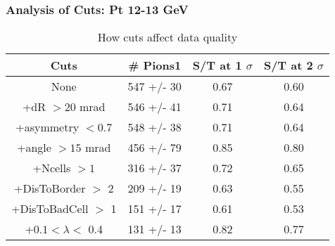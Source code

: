 \frame
{
\frametitle{Analysis of Cuts: Pt 12-13 GeV}
\begin{table}
\caption{How cuts affect data quality}
\centering
\begin{tabular}{c c c c}
\hline\hline
Cuts & \# Pions1 & S/T at 1 $\sigma$ & S/T at 2 $\sigma$ \\ [0.5ex]
\hline
None &  547 +/-   30 & 0.67 & 0.60 \\ %
+dR $> 20$ mrad &  546 +/-   41 & 0.71 & 0.64 \\ %
+asymmetry $< 0.7$ &  548 +/-   38 & 0.71 & 0.64 \\ %
+angle $> 15$ mrad &  456 +/-   79 & 0.85 & 0.80 \\ %
+Ncells $> 1$&  316 +/-   37 & 0.72 & 0.65 \\ %
+DisToBorder $>$ 2 &  209 +/-   19 & 0.63 & 0.55 \\ %
+DisToBadCell $>$ 1&  151 +/-   17 & 0.61 & 0.53 \\ %
+$0.1 < \lambda <$ 0.4 &  131 +/-   13 & 0.82 & 0.77 \\ %
[1ex]
\hline
\end{tabular}
\label{table:nonlin}
\end{table}
}
